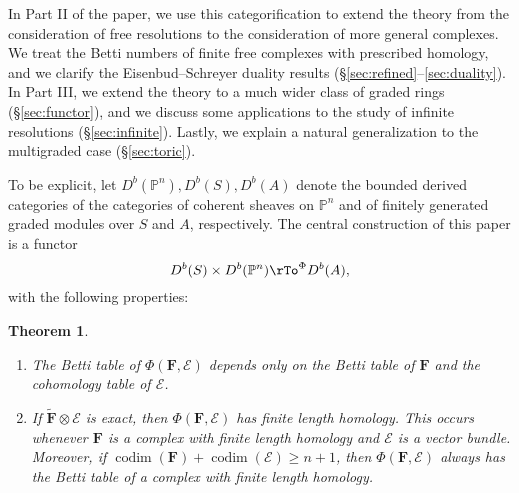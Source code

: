 \documentclass[12pt]{amsart}
\newtheorem{theorem}[lemma]{Theorem}
\theoremstyle{definition}
\theoremstyle{remark}
\newcommand{\kk}{\Bbbk}
\newcommand{\codim}{\operatorname{codim}}
\newcommand{\cE}{\mathcal{E}}
\newcommand{\FF}{\mathbf{F}}
\renewcommand{\P}{{\mathbb P}}
\begin{document}
In Part II of the paper, we use this categorification to extend the theory from the consideration of free resolutions to the consideration of more general complexes. We treat the Betti numbers of finite free complexes with prescribed homology, and we clarify the Eisenbud--Schreyer duality results (\S\ref{sec:refined}--\ref{sec:duality}).  In Part III, we extend the theory to a much wider class of graded rings (\S\ref{sec:functor}), and we discuss some applications to the study of infinite resolutions (\S\ref{sec:infinite}).  Lastly, we explain a natural generalization to the multigraded case (\S\ref{sec:toric}).

To be explicit, 
let $D^{b}(\P^{n}), D^{b}(S), D^{b}(A)$ denote the bounded derived categories of the categories of coherent sheaves on $\P^{n}$ and of finitely generated graded modules over $S$ and $A$, respectively.  The central construction of this paper is a functor
$$
D^{b}(S)\times D^{b}(\P^{n})  \rTo^{\Phi} D^{b}(A),
$$
with the following properties:
\begin{theorem}\label{thm:Phi}
\begin{enumerate}
	\item\label{thm:Phi:1}  The Betti table of $\Phi(\FF,\cE)$ depends only on the Betti table of $\FF$ and the cohomology table of $\cE$.
	\item\label{thm:Phi:2}  If $\widetilde{\FF}\otimes \cE$ is exact, then $\Phi(\FF,\cE)$ has finite length homology.  This occurs whenever $\FF$ is a complex with finite length homology and $\cE$ is a vector bundle.  Moreover, if $\codim(\FF)+\codim(\cE)\geq n+1$, then $\Phi(\FF,\cE)$ always has the Betti table of a complex with finite length homology.
\end{enumerate}
\end{theorem}
\end{document}
